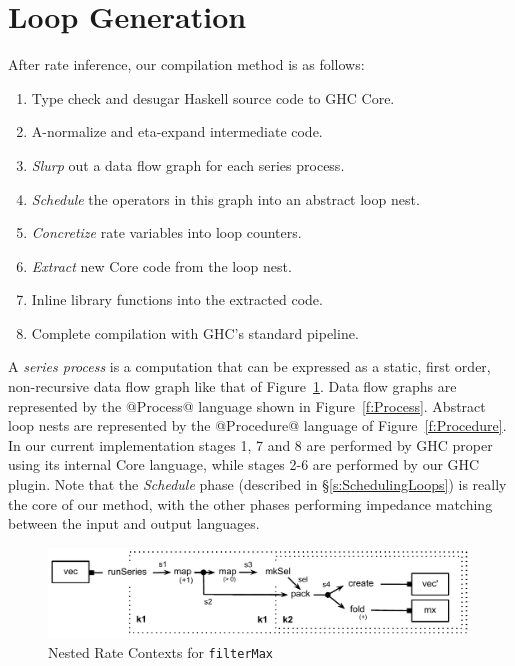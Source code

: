 
\section{Loop Generation}
\label{s:LoopGeneration}
After rate inference, our compilation method is as follows:

\begin{enumerate}
\item   Type check and desugar Haskell source code to GHC Core.
\item   A-normalize and eta-expand intermediate code.
\item   \emph{Slurp} out a data flow graph for each series process.
\item   \emph{Schedule} the operators in this graph into an abstract loop nest.
\item   \emph{Concretize} rate variables into loop counters.
\item   \emph{Extract}    new Core code from the loop nest.
\item   Inline library functions into the extracted code.
\item   Complete compilation with GHC's standard pipeline.
\end{enumerate}

A \emph{series process} is a computation that can be expressed as a static, first order, non-recursive data flow graph like that of Figure~\ref{f:nested-contexts}. Data flow graphs are represented by the @Process@ language shown in Figure~\ref{f:Process}. Abstract loop nests are represented by the @Procedure@ language of Figure~\ref{f:Procedure}. In our current implementation stages 1, 7 and 8 are performed by GHC proper using its internal Core language, while stages 2-6 are performed by our GHC plugin. Note that the \emph{Schedule} phase (described in \S\ref{s:SchedulingLoops}) is really the core of our method, with the other phases performing impedance matching between the input and output languages. 





\begin{figure}[t]
\begin{center}
\includegraphics[scale=0.8]{figures/flow-contexts.pdf}
\end{center}
\caption{Nested Rate Contexts for \texttt{filterMax}}
\label{f:nested-contexts}
\end{figure}


